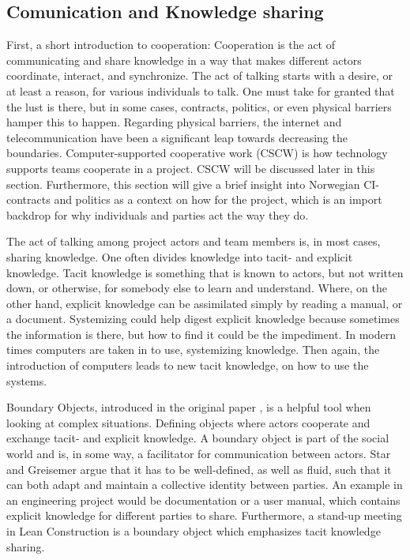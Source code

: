 \subsection{Comunication and Knowledge sharing}
First, a short introduction to cooperation: Cooperation is the act of communicating and share knowledge in a way that makes different actors coordinate, interact, and synchronize. The act of talking starts with a desire, or at least a reason, for various individuals to talk. One must take for granted that the lust is there, but in some cases, contracts, politics, or even physical barriers hamper this to happen. Regarding physical barriers, the internet and telecommunication have been a significant leap towards decreasing the boundaries. Computer-supported cooperative work (CSCW) is how technology supports teams cooperate in a project. CSCW will be discussed later in this section. Furthermore, this section will give a brief insight into Norwegian CI- contracts and politics as a context on how for the project, which is an import backdrop for why individuals and parties act the way they do. 

The act of talking among project actors and team members is, in most cases, sharing knowledge. One often divides knowledge into tacit- and explicit knowledge. Tacit knowledge is something that is known to actors, but not written down, or otherwise, for somebody else to learn and understand. Where, on the other hand, explicit knowledge can be assimilated simply by reading a manual, or a document. Systemizing could help digest explicit knowledge because sometimes the information is there, but how to find it could be the impediment. In modern times computers are taken in to use, systemizing knowledge. Then again, the introduction of computers leads to new tacit knowledge, on how to use the systems.

Boundary Objects, introduced in the original paper \cite{star&griesemer}, is a helpful tool when looking at complex situations. Defining objects where actors cooperate and exchange tacit- and explicit knowledge. A boundary object is part of the social world and is, in some way, a facilitator for communication between actors. Star and Greisemer argue that it has to be well-defined, as well as fluid, such that it can both adapt and maintain a collective identity between parties. An example in an engineering project would be documentation or a user manual, which contains explicit knowledge for different parties to share. Furthermore, a stand-up meeting in Lean Construction is a boundary object which emphasizes tacit knowledge sharing.

